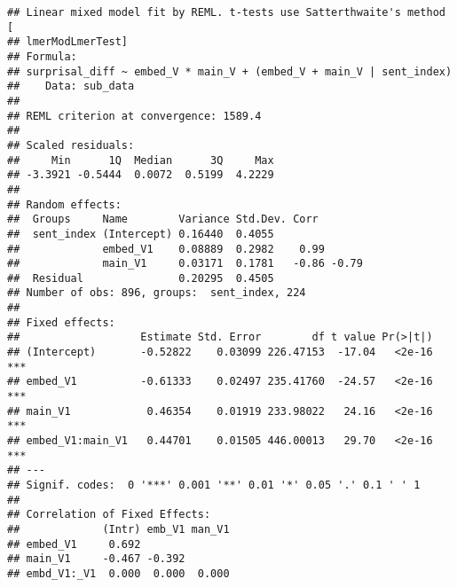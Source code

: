 \documentclass[]{ltjsarticle}
\begin{document}
\begin{verbatim}
## Linear mixed model fit by REML. t-tests use Satterthwaite's method [
## lmerModLmerTest]
## Formula: 
## surprisal_diff ~ embed_V * main_V + (embed_V + main_V | sent_index)
##    Data: sub_data
## 
## REML criterion at convergence: 1589.4
## 
## Scaled residuals: 
##     Min      1Q  Median      3Q     Max 
## -3.3921 -0.5444  0.0072  0.5199  4.2229 
## 
## Random effects:
##  Groups     Name        Variance Std.Dev. Corr       
##  sent_index (Intercept) 0.16440  0.4055              
##             embed_V1    0.08889  0.2982    0.99      
##             main_V1     0.03171  0.1781   -0.86 -0.79
##  Residual               0.20295  0.4505              
## Number of obs: 896, groups:  sent_index, 224
## 
## Fixed effects:
##                   Estimate Std. Error        df t value Pr(>|t|)    
## (Intercept)       -0.52822    0.03099 226.47153  -17.04   <2e-16 ***
## embed_V1          -0.61333    0.02497 235.41760  -24.57   <2e-16 ***
## main_V1            0.46354    0.01919 233.98022   24.16   <2e-16 ***
## embed_V1:main_V1   0.44701    0.01505 446.00013   29.70   <2e-16 ***
## ---
## Signif. codes:  0 '***' 0.001 '**' 0.01 '*' 0.05 '.' 0.1 ' ' 1
## 
## Correlation of Fixed Effects:
##             (Intr) emb_V1 man_V1
## embed_V1     0.692              
## main_V1     -0.467 -0.392       
## embd_V1:_V1  0.000  0.000  0.000
\end{verbatim}
\end{document}
